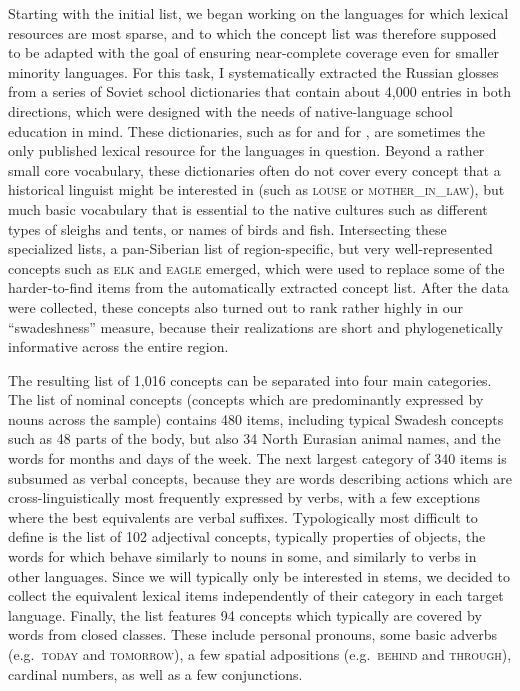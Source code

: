 Starting with the initial list, we began working on the languages for which lexical resources are most sparse, and to which the concept list was therefore supposed to be adapted with the goal of ensuring near-complete coverage even for smaller minority languages. For this task, I systematically extracted the Russian glosses from a series of Soviet school dictionaries that contain about 4,000 entries in both directions, which were designed with the needs of native-language school education in mind. These dictionaries, such as \cite{menovshchikov1988} for  and \cite{volodin1989} for , are sometimes the only published lexical resource for the languages in question. Beyond a rather small core vocabulary, these dictionaries often do not cover every concept that a historical linguist might be interested in (such as \textsc{louse} or \textsc{mother\_in\_law}), but much basic vocabulary that is essential to the native cultures such as different types of sleighs and tents, or names of birds
and fish. Intersecting these specialized lists, a pan-Siberian list of region-specific, but very well-represented concepts such as \textsc{elk} and \textsc{eagle} emerged, which were used to replace some of the harder-to-find items from the automatically extracted concept list. After the data were collected, these concepts also turned out to rank rather highly in our ``swadeshness'' measure, because their realizations are short and phylogenetically informative across the entire region.

The resulting list of 1,016 concepts can be separated into four main categories. The list of nominal concepts (concepts which are predominantly expressed by nouns across the sample) contains 480 items, including typical Swadesh concepts such as 48 parts of the body, but also 34 North Eurasian animal names, and the words for months and days of the week. The next largest category of 340 items is subsumed as verbal concepts, because they are words describing actions which are cross-linguistically most frequently expressed by verbs, with a few exceptions where the best equivalents are verbal suffixes. Typologically most difficult to define is the list of 102 adjectival concepts, typically properties of objects, the words for which behave similarly to nouns in some, and similarly to verbs in other languages. Since we will typically only be interested in stems, we decided to collect the equivalent lexical items independently of their category in each target language. Finally, the list features 94 concepts which
typically are covered by words from closed classes. These include personal pronouns, some basic adverbs (e.g.\ \textsc{today} and \textsc{tomorrow}), a few spatial adpositions (e.g.\ \textsc{behind} and \textsc{through}), cardinal numbers, as well as a few conjunctions.

